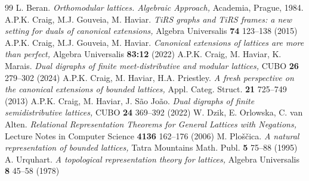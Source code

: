 \documentclass[a4paper]{article} %
\begin{document}
\begin{thebibliography}{99}
L. Beran.
\newblock \emph{Orthomodular lattices. Algebraic Approach,}
\newblock Academia, Prague, 1984.
A.P.K. Craig, M.J. Gouveia, M. Haviar.
\newblock \emph{TiRS graphs and TiRS frames: a new setting for duals of canonical extensions,}
\newblock Algebra Universalis \textbf{74} 123--138 (2015)
A.P.K. Craig, M.J. Gouveia, M. Haviar.
\newblock \emph{Canonical extensions of lattices are more than perfect,}
\newblock Algebra Universalis \textbf{83:12} (2022)
A.P.K. Craig, M. Haviar, K. Marais.
\newblock \emph{Dual digraphs of finite meet-distributive and modular lattices,}
\newblock CUBO \textbf{26} 279--302 (2024)
A.P.K. Craig, M. Haviar, H.A. Priestley.
\newblock \emph{A fresh perspective on the canonical extensions of bounded lattices,}
\newblock Appl. Categ. Struct. \textbf{21} 725--749 (2013)
A.P.K. Craig, M. Haviar, J. S\~{a}o Jo\~{a}o.
\newblock \emph{Dual digraphs of finite semidistributive lattices,}
\newblock CUBO \textbf{24} 369--392 (2022)
W. Dzik, E. Orlowska, C. van Alten.
\newblock \emph{Relational Representation Theorems for General Lattices with Negations,}
\newblock Lecture Notes in Computer Science \textbf{4136} 162--176 (2006)
M. Plo\v{s}\v{c}ica.
\newblock \emph{A natural representation of bounded lattices,}
\newblock Tatra Mountains Math. Publ. \textbf{5} 75--88 (1995)
A. Urquhart.
\newblock \emph{A topological representation theory for lattices,}
\newblock Algebra Universalis \textbf{8} 45--58 (1978)

\end{thebibliography}
\end{document}
